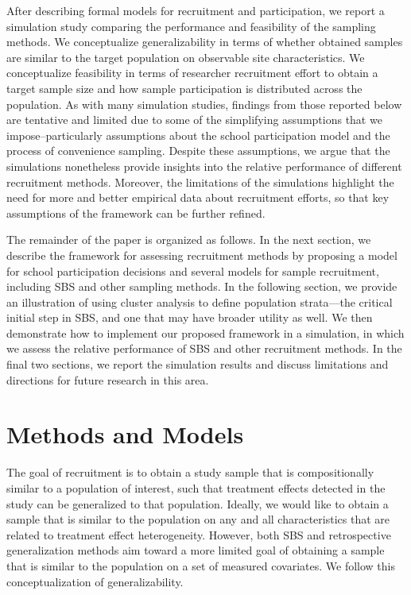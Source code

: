 \documentclass[
  english,
  man,floatsintext]{apa6}
\begin{document}
After describing formal models for recruitment and participation, we report a simulation study comparing the performance and feasibility of the sampling methods. We conceptualize generalizability in terms of whether obtained samples are similar to the target population on observable site characteristics. We conceptualize
feasibility in terms of researcher recruitment effort to obtain a target sample size and how sample participation is distributed across the population.
As with many simulation studies, findings from those reported below are tentative and limited due to some of the simplifying assumptions that we impose--particularly assumptions about the school participation model and the process of convenience sampling.
Despite these assumptions, we argue that the simulations nonetheless provide insights into the relative performance of different recruitment methods.
Moreover, the limitations of the simulations highlight the need for more and better empirical data about recruitment efforts, so that key assumptions of the framework can be further refined.

The remainder of the paper is organized as follows. In the next section, we describe the framework for assessing recruitment methods by proposing a model for school participation decisions and several models for sample recruitment, including SBS and other sampling methods. In the following section, we provide an illustration of using cluster analysis to define population strata---the critical initial step in SBS, and one that may have broader utility as well. We then demonstrate how to implement our proposed framework in a simulation, in which we assess the relative performance of SBS and other recruitment methods. In the final two sections, we report the simulation results and discuss limitations and directions for future research in this area.

\hypertarget{methods-and-models}{%
\section{Methods and Models}\label{methods-and-models}}

The goal of recruitment is to obtain a study sample that is compositionally similar to a population of interest, such that treatment effects detected in the study can be generalized to that population.
Ideally, we would like to obtain a sample that is similar to the population on any and all characteristics that are related to treatment effect heterogeneity.
However, both SBS and retrospective generalization methods aim toward a more limited goal of obtaining a sample that is similar to the population on a set of measured covariates.
We follow this conceptualization of generalizability.
\end{document}
